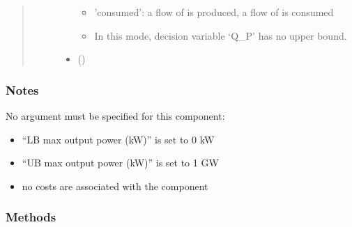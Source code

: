 \documentclass[letterpaper,10pt,english]{sphinxmanual}
\begin{document}
\begin{fulllineitems}
\begin{fulllineitems}
\begin{quote}
\begin{description}
\begin{itemize}
\begin{itemize}
\item {} 
\sphinxAtStartPar
’consumed’: a flow of  is produced, a flow of  is consumed

\item {} \begin{description}
\sphinxAtStartPar
In this mode, decision variable ‘Q\_P’ has no upper bound.

\end{description}

\end{itemize}


\item {} 
\sphinxAtStartPar
{} (\sphinxstyleliteralemphasis{\sphinxupquote{, }}) \textendash{} 

\end{itemize}

\end{description}\end{quote}
\subsubsection*{Notes}

\sphinxAtStartPar
No  argument must be specified for this component:
\begin{itemize}
\item {} 
\sphinxAtStartPar
“LB max output power (kW)” is set to 0 kW

\item {} 
\sphinxAtStartPar
“UB max output power (kW)” is set to 1 GW

\item {} 
\sphinxAtStartPar
no costs are associated with the component

\end{itemize}

\end{fulllineitems}

\subsubsection*{Methods}


\begin{savenotes}\sphinxattablestart
\centering
\begin{tabulary}{\linewidth}[t]{}
\hline


\end{tabulary}
\end{savenotes}
\end{fulllineitems}
\end{document}
